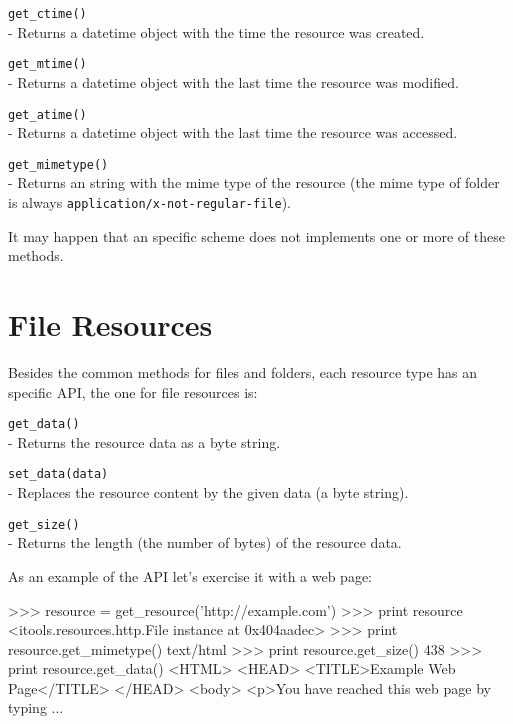 \begin{api}
  {\tt get\_ctime()}\\
  - Returns a datetime object with the time the resource was created.

  {\tt get\_mtime()}\\
  - Returns a datetime object with the last time the resource was modified.

  {\tt get\_atime()}\\
  - Returns a datetime object with the last time the resource was accessed.

  {\tt get\_mimetype()}\\
  - Returns an string with the mime type of the resource (the mime type of
    folder is always {\tt application/x-not-regular-file}).
\end{api}

It may happen that an specific scheme does not implements one or more of
these methods.

\section{File Resources}

Besides the common methods for files and folders, each resource type has
an specific API, the one for file resources is:

\begin{api}
  {\tt get\_data()}\\
  - Returns the resource data as a byte string.

  {\tt set\_data(data)}\\
  - Replaces the resource content by the given data (a byte string).

  {\tt get\_size()}\\
  - Returns the length (the number of bytes) of the resource data.
\end{api}

As an example of the API let's exercise it with a web page:

\begin{code}
    >>> resource = get_resource('http://example.com')
    >>> print resource
    <itools.resources.http.File instance at 0x404aadec>
    >>> print resource.get_mimetype()
    text/html
    >>> print resource.get_size()
    438
    >>> print resource.get_data()
    <HTML>
    <HEAD>
      <TITLE>Example Web Page</TITLE>
    </HEAD> 
    <body>  
    <p>You have reached this web page by typing
    ...
\end{code}

